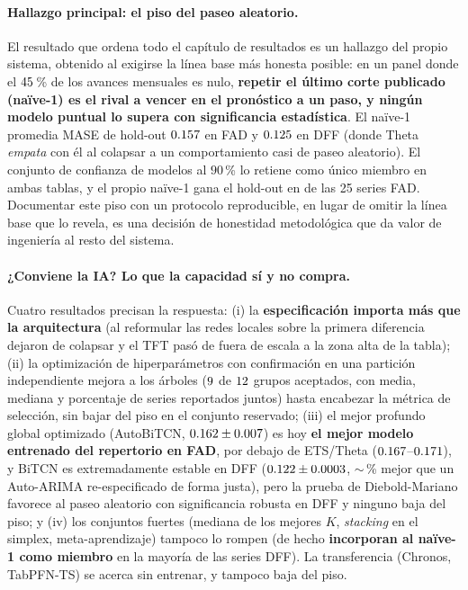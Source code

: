 \documentclass[12pt,letterpaper]{report}
\begin{document}
\paragraph{Hallazgo principal: el piso del paseo aleatorio.} El resultado que ordena todo
el capítulo de resultados es un hallazgo del propio sistema, obtenido al exigirse la línea
base más honesta posible: en un panel donde el $45$\,\% de los avances
mensuales es nulo, \textbf{repetir el último corte publicado (naïve-1) es el rival a
vencer en el pronóstico a un paso, y ningún modelo puntual lo supera con significancia
estadística}. El naïve-1 promedia MASE de hold-out $0.157$ en FAD y $0.125$ en DFF (donde
Theta \textit{empata} con él al colapsar a un comportamiento casi de paseo aleatorio). El
conjunto de confianza de modelos al $90$\,\% lo retiene como único miembro en ambas
tablas, y el propio naïve-1 gana el hold-out en \factNaiveOneFadHoldoutWins{} de las 25 series FAD. Documentar este piso con un
protocolo reproducible, en lugar de omitir la línea base que lo revela, es una decisión de
honestidad metodológica que da valor de ingeniería al resto del sistema.

\paragraph{¿Conviene la IA? Lo que la capacidad sí y no compra.} Cuatro resultados
precisan la respuesta: (i) la \textbf{especificación importa más que la arquitectura} (al
reformular las redes locales sobre la primera diferencia dejaron de colapsar y el TFT pasó
de fuera de escala a la zona alta de la tabla); (ii) la optimización de hiperparámetros
con confirmación en una partición independiente mejora a los árboles ($9$ de $12$ grupos
aceptados, con media, mediana y porcentaje de series reportados juntos) hasta encabezar la
métrica de selección, sin bajar del piso en el conjunto reservado; (iii) el mejor profundo
global optimizado (AutoBiTCN, $0.162\pm0.007$) es hoy \textbf{el mejor
modelo entrenado del repertorio en FAD}, por debajo de ETS/Theta
($0.167$--$0.171$), y BiTCN es extremadamente estable en DFF
($0.122\pm0.0003$, $\sim$\factDeepDffMarginPct\,\% mejor que un Auto-ARIMA re-especificado
de forma justa), pero la prueba de Diebold-Mariano favorece al paseo aleatorio con
significancia robusta en DFF y ninguno baja del piso; y (iv) los conjuntos fuertes
(mediana de los mejores $K$, \textit{stacking} en el simplex, meta-aprendizaje) tampoco lo
rompen (de hecho \textbf{incorporan al naïve-1 como miembro} en la mayoría de las series
DFF). La transferencia (Chronos, TabPFN-TS) se acerca sin entrenar, y tampoco baja del
piso.
\end{document}
